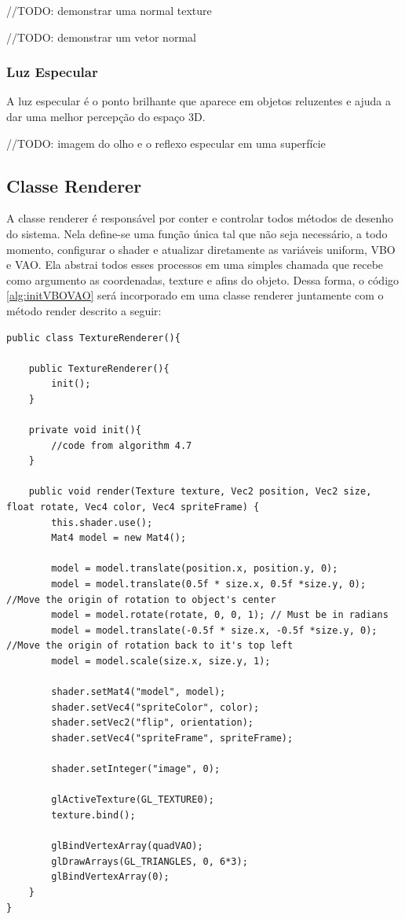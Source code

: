 \documentclass[12pt, 
openright, 
oneside, 
a4paper,    
brazil]{facom-ufu-abntex2}
\begin{document}
//TODO: demonstrar uma normal texture

//TODO: demonstrar um vetor normal


\subsubsection{Luz Especular}
A luz especular é o ponto brilhante que aparece em objetos reluzentes e ajuda a dar uma melhor percepção do espaço 3D.

//TODO: imagem do olho e o reflexo especular em uma superfície


\subsection{Classe Renderer}

A classe renderer é responsável por conter e controlar todos métodos de desenho do sistema. Nela define-se uma função única tal que não seja necessário, a todo momento, configurar o shader e atualizar diretamente as variáveis uniform, VBO e VAO. Ela abstrai todos esses processos em uma simples chamada que recebe como argumento as coordenadas, texture e afins do objeto. Dessa forma, o código \ref{alg:initVBOVAO} será incorporado em uma classe renderer juntamente com o método render descrito a seguir:


\begin{lstlisting}[caption=Classe renderer simples]
public class TextureRenderer(){

	public TextureRenderer(){
		init();
	}

	private void init(){
		//code from algorithm 4.7
	}

	public void render(Texture texture, Vec2 position, Vec2 size, float rotate, Vec4 color, Vec4 spriteFrame) {
		this.shader.use();
		Mat4 model = new Mat4();
		
		model = model.translate(position.x, position.y, 0);
		model = model.translate(0.5f * size.x, 0.5f *size.y, 0); //Move the origin of rotation to object's center
		model = model.rotate(rotate, 0, 0, 1); // Must be in radians
		model = model.translate(-0.5f * size.x, -0.5f *size.y, 0); //Move the origin of rotation back to it's top left
		model = model.scale(size.x, size.y, 1);
		
		shader.setMat4("model", model);
		shader.setVec4("spriteColor", color);
		shader.setVec2("flip", orientation);
		shader.setVec4("spriteFrame", spriteFrame);
		
		shader.setInteger("image", 0);
		
		glActiveTexture(GL_TEXTURE0);
		texture.bind();

		glBindVertexArray(quadVAO);
		glDrawArrays(GL_TRIANGLES, 0, 6*3);
		glBindVertexArray(0);
	}
}
\end{lstlisting}
\end{document}

